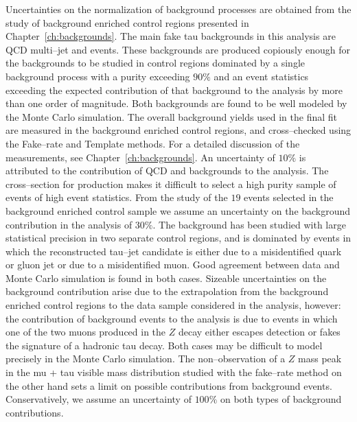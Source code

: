Uncertainties on the normalization of background processes are obtained from the
study of background enriched control regions presented in
Chapter~\ref{ch:backgrounds}.  The main fake tau backgrounds in this analysis
are QCD multi--jet and \WpJets events.  These backgrounds are produced copiously
enough for the backgrounds to be studied in control regions dominated by a
single background process with a purity exceeding $90\%$ and an event statistics
exceeding the expected contribution of that background to the analysis by more
than one order of magnitude.  Both backgrounds are found to be well modeled by
the Monte Carlo simulation. The overall background yields used in the final fit
are measured in the background enriched control regions, and cross--checked
using the Fake--rate and Template methods. For a detailed discussion of the
measurements, see Chapter~\ref{ch:backgrounds}.  An uncertainty of $10\%$ is
attributed to the contribution of QCD and \WpJets backgrounds to the analysis.
The cross--section for \ttbarpJets production makes it difficult to select a
high purity sample of \ttbarpJets events of high event statistics.  From the
study of the $19$ events selected in the \ttbarpJets background enriched control
sample we assume an uncertainty on the \ttbarpJets background contribution in
the analysis of $30\%$.  The \ZMM background has been studied with large
statistical precision in two separate control regions, and is dominated by
events in which the reconstructed tau--jet candidate is either due to a
misidentified quark or gluon jet or due to a misidentified muon.  Good agreement
between data and Monte Carlo simulation is found in both cases.  Sizeable
uncertainties on the \ZMM background contribution arise due to the extrapolation
from the background enriched control regions to the data sample considered in
the analysis, however: the contribution of \ZMM background events to the
analysis is due to events in which one of the two muons produced in the $Z$
decay either escapes detection or fakes the signature of a hadronic tau decay.
Both cases may be difficult to model precisely in the Monte Carlo simulation.
The non--observation of a $Z$ mass peak in the mu + tau visible mass
distribution studied with the fake--rate method on the other hand sets a limit
on possible contributions from \ZMM background events.  Conservatively, we
assume an uncertainty of $100\%$ on both types of \ZMM background contributions.

